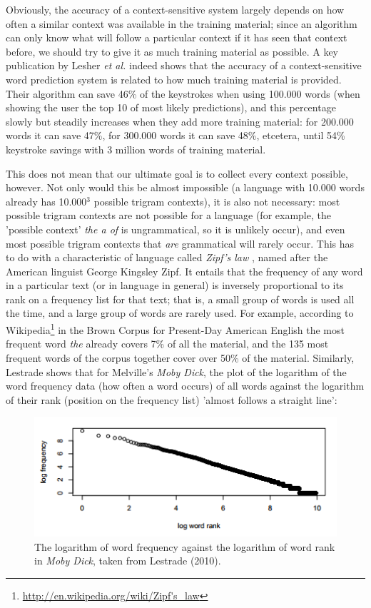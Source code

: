 \documentclass[11pt]{article}
\begin{document}
Obviously, the accuracy of a context-sensitive system largely depends on how often a similar context was available in the training material; since an algorithm can only know what will follow a particular context if it has seen that context before, we should try to give it as much training material as possible. A key publication by Lesher {\em et al.}  indeed shows that the accuracy of a context-sensitive word prediction system is related to how much training material is provided. Their algorithm can save 46\% of the keystrokes when using 100.000 words (when showing the user the top 10 of most likely predictions), and this percentage slowly but steadily increases when they add more training material: for 200.000 words it can save 47\%, for 300.000 words it can save 48\%, etcetera, until 54\% keystroke savings with 3 million words of training material.

This does not mean that our ultimate goal is to collect every context possible, however. Not only would this be almost impossible (a language with 10.000 words already has 10.000$^3$ possible trigram contexts), it is also not necessary: most possible trigram contexts are not possible for a language (for example, the 'possible context' \emph{the a of} is ungrammatical, so it is unlikely occur), and even most possible trigram contexts that \emph{are} grammatical will rarely occur. This has to do with a characteristic of language called \emph{Zipf's law} \cite{zipf65}, named after the American linguist George Kingsley Zipf. It entails that the frequency of any word in a particular text (or in language in general) is inversely proportional to its rank on a frequency list for that text; that is, a small group of words is used all the time, and a large group of words are rarely used. For example, according to Wikipedia\footnote{\url{http://en.wikipedia.org/wiki/Zipf's\_law}} in the Brown Corpus for Present-Day American English the most frequent word \emph{the} already covers 7\% of all the material, and the 135 most frequent words of the corpus together cover over 50\% of the material. Similarly, Lestrade  shows that for Melville's \emph{Moby Dick}, the plot of the logarithm of the word frequency data (how often a word occurs) of all words against the logarithm of their rank (position on the frequency list) 'almost follows a straight line': 

\begin{figure}[H]
\includegraphics[scale=1]{lestrade} \centering
\caption{The logarithm of word frequency against the logarithm of word rank in \emph{Moby Dick}, taken from Lestrade (2010).}
\end{figure}
\end{document}
